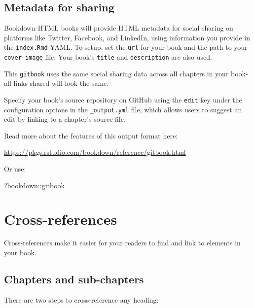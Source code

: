 \documentclass[
]{book}
\newenvironment{Shaded}{\begin{snugshade}}{\end{snugshade}}
\newcommand{\NormalTok}[1]{#1}
\newcommand{\SpecialCharTok}[1]{\textcolor[rgb]{0.00,0.00,0.00}{#1}}
\theoremstyle{definition}
\theoremstyle{definition}
\theoremstyle{definition}
\theoremstyle{definition}
\theoremstyle{remark}
\begin{document}
\hypertarget{metadata-for-sharing}{%
\section{Metadata for sharing}\label{metadata-for-sharing}}

Bookdown HTML books will provide HTML metadata for social sharing on platforms like Twitter, Facebook, and LinkedIn, using information you provide in the \texttt{index.Rmd} YAML. To setup, set the \texttt{url} for your book and the path to your \texttt{cover-image} file. Your book's \texttt{title} and \texttt{description} are also used.

This \texttt{gitbook} uses the same social sharing data across all chapters in your book- all links shared will look the same.

Specify your book's source repository on GitHub using the \texttt{edit} key under the configuration options in the \texttt{\_output.yml} file, which allows users to suggest an edit by linking to a chapter's source file.

Read more about the features of this output format here:

\url{https://pkgs.rstudio.com/bookdown/reference/gitbook.html}

Or use:

\begin{Shaded}
\begin{Highlighting}[]
\NormalTok{?bookdown}\SpecialCharTok{::}\NormalTok{gitbook}
\end{Highlighting}
\end{Shaded}

\hypertarget{cross}{%
\chapter{Cross-references}\label{cross}}

Cross-references make it easier for your readers to find and link to elements in your book.

\hypertarget{chapters-and-sub-chapters}{%
\section{Chapters and sub-chapters}\label{chapters-and-sub-chapters}}

There are two steps to cross-reference any heading:
\end{document}
